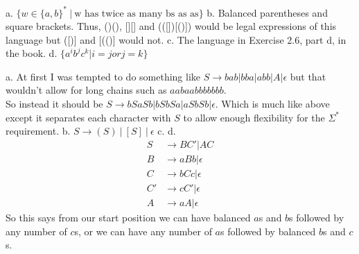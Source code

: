 




\homeworkheader{\classnameandsection}

\begin{problem}{1}
  a. $\{w \in \{a,b\}^*\ |\ \text{w has twice as many bs as as} \}$
  \br
  b. Balanced parentheses and square brackets. Thus, ()(), [][] and (([])[()]) would be legal expressions of this
     language but ([)] and [(()] would not.
  \br
  c. The language in Exercise 2.6, part d, in the book.
  \br
  d. $\{ a^ib^jc^k | i = j or j = k \}$
  \begin{solution}
    a. At first I was tempted to do something like $S \rightarrow bab | bba | abb | A | \epsilon$ but that wouldn't
    allow for long chains such as $aabaabbbbbbb$. \\ So instead it should be $S \rightarrow bSaSb | bSbSa |
    aSbSb|\epsilon$. Which is much like above except it separates each character with $S$ to allow enough flexibility
    for the $\Sigma^*$ requirement.
    \br
    b. $S \rightarrow (S)\ |\ [S]\ |\ \epsilon$
    \br
    c.
    \br
    d.
    \begin{align*}
      S &\rightarrow BC'|AC \\
      B &\rightarrow aBb | \epsilon \\
      C &\rightarrow bCc | \epsilon \\
      C' &\rightarrow cC' | \epsilon \\
      A &\rightarrow aA | \epsilon
    \end{align*}
    So this says from our start position we can have balanced $a$s and $b$s followed by any number of $c$s, or we can
    have any number of $a$s followed by balanced $b$s and $c$s.
  \end{solution}
\end{problem}

